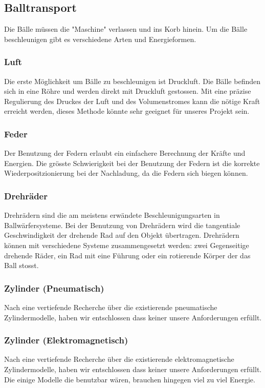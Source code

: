 \subsection{Balltransport}
Die Bälle müssen die "Maschine" verlassen und ins Korb hinein. Um die Bälle beschleunigen gibt es verschiedene Arten und Energieformen.
\subsubsection{Luft}
Die erste Möglichkeit um Bälle zu beschleunigen ist Druckluft. Die Bälle befinden sich in eine Röhre und werden direkt mit Druckluft gestossen. Mit eine präzise Regulierung des Druckes der Luft und des Volumenstromes kann die nötige Kraft erreicht werden, dieses Methode könnte sehr geeignet für unseres Projekt sein.
\subsubsection{Feder}
Der Benutzung der Federn erlaubt ein einfachere Berechnung der Kräfte und Energien. Die grösste Schwierigkeit bei der Benutzung der Federn ist die korrekte Wiederpositzionierung bei der Nachladung, da die Federn sich biegen können.
\subsubsection{Drehräder}
Drehrädern sind die am meistens erwändete Beschleunigungsarten in Ballwärfersysteme. Bei der Benutzung von Drehrädern wird die tangentiale Geschwindigkeit der drehende Rad auf den Objekt übertragen. Drehrädern können mit verschiedene Systeme zusammengesetzt werden: zwei Gegenseitige drehende Räder, ein Rad mit eine Führung oder ein rotierende Körper der das Ball stosst.
\subsubsection{Zylinder (Pneumatisch)}
Nach eine vertiefende Recherche über die existierende pneumatische Zylindermodelle, haben wir entschlossen dass keiner unsere Anforderungen erfüllt. 
\subsubsection{Zylinder (Elektromagnetisch)}
Nach eine vertiefende Recherche über die existierende elektromagnetische Zylindermodelle, haben wir entschlossen dass keiner unsere Anforderungen erfüllt. Die einige Modelle die benutzbar wären, brauchen hingegen viel zu viel Energie.